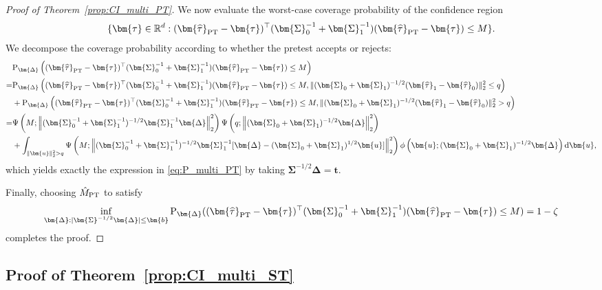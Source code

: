 \documentclass[11pt]{article}
\def\P{{\mathrm P}}
\def\d{{\mathrm d}}
\newcommand{\htau}{\widehat\tau}
\numberwithin{equation}{section}
\theoremstyle{definition}
\begin{document}
\begin{proof}[Proof of Theorem~\ref{prop:CI_multi_PT}]
We now evaluate the worst-case coverage probability of the confidence region
\[
  \{\bm{\tau}\in\mathbb{R}^d:(\bm{\htau}_{\rm PT}-\bm{\tau})^\top (\bm{\Sigma}_0^{-1} + \bm{\Sigma}_1^{-1})(\bm{\htau}_{\rm PT}-\bm{\tau})\le M\}.
\]
We decompose the coverage probability according to whether the
pretest accepts or rejects:
\begin{align*}
  &\P_{\bm{\Delta}}\left((\bm{\htau}_{\rm PT}-\bm{\tau})^\top (\bm{\Sigma}_0^{-1} + \bm{\Sigma}_1^{-1})(\bm{\htau}_{\rm PT}-\bm{\tau})\le M\right)\\
  =& \P_{\bm{\Delta}}\left((\bm{\htau}_{\rm PT}-\bm{\tau})^\top (\bm{\Sigma}_0^{-1} + \bm{\Sigma}_1^{-1})(\bm{\htau}_{\rm PT}-\bm{\tau})\le M, \lVert (\bm{\Sigma}_0+ \bm{\Sigma}_1)^{-1/2}(\bm{\htau}_1 - \bm{\htau}_0) \rVert_2^2 \le q\right) \\
  &+ \P_{\bm{\Delta}}\left((\bm{\htau}_{\rm PT}-\bm{\tau})^\top (\bm{\Sigma}_0^{-1} + \bm{\Sigma}_1^{-1})(\bm{\htau}_{\rm PT}-\bm{\tau})\le M, \lVert (\bm{\Sigma}_0+ \bm{\Sigma}_1)^{-1/2}(\bm{\htau}_1 - \bm{\htau}_0) \rVert_2^2 > q\right)\\
  =& \Psi\left(M;\left\lVert (\bm{\Sigma}_0^{-1} + \bm{\Sigma}_1^{-1})^{-1/2} \bm{\Sigma}_1^{-1} \bm{\Delta}\right\rVert_2^2\right) \Psi\left(q; \left\lVert (\bm{\Sigma}_0 + \bm{\Sigma}_1)^{-1/2} \bm{\Delta}\right\rVert_2^2\right)\\
  &+ \int_{\lVert \bm{u} \rVert_2^2 > q} \Psi\left(M;\left\lVert (\bm{\Sigma}_0^{-1} + \bm{\Sigma}_1^{-1})^{-1/2} \bm{\Sigma}_1^{-1} [\bm{\Delta} - (\bm{\Sigma}_0+ \bm{\Sigma}_1)^{1/2} \bm{u}]\right\rVert_2^2\right) \phi\left(\bm{u};(\bm{\Sigma}_0 + \bm{\Sigma}_1)^{-1/2} \bm{\Delta}\right) \d \bm{u},
\end{align*}
which yields exactly the expression in \eqref{eq:P_multi_PT} by taking $\bm{\Sigma}^{-1/2}\bm{\Delta} = \bm{t}$.

Finally, choosing $\hat M_{\rm PT}$ to satisfy
\[
  \inf_{\bm{\Delta}: \lvert \bm{\Sigma}^{-1/2} \bm{\Delta}\rvert \le \bm{b}} \P_{\bm{\Delta}}((\bm{\htau}_{\rm PT} - \bm{\tau})^\top (\bm{\Sigma}_0^{-1} + \bm{\Sigma}_1^{-1}) (\bm{\htau}_{\rm PT} - \bm{\tau}) \le M) = 1-\zeta
\]
completes the proof.

\end{proof}

\subsection{Proof of Theorem~\ref{prop:CI_multi_ST}}
\end{document}
